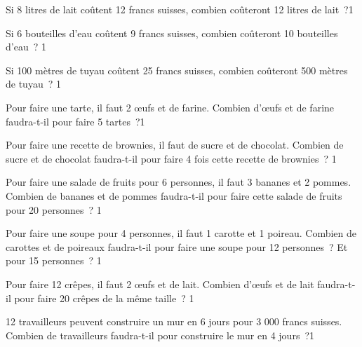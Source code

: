 \documentclass[a4paper,11pt]{report}
\begin{document}
\begin{exo} %
{Si 8 litres de lait coûtent 12 francs suisses, combien coûteront 12 litres de lait~?}{1}
\end{exo}

\begin{exo} %
{Si 6 bouteilles d'eau coûtent 9 francs suisses, combien coûteront 10 bouteilles d'eau~?
}{1}
\end{exo}


\begin{exo} %
{Si 100 mètres de tuyau coûtent 25 francs suisses, combien coûteront 500 mètres de tuyau~?
}{1}
\end{exo}

\begin{exo} %
	{Pour faire une tarte, il faut 2 œufs et  de farine. Combien d'œufs et de farine faudra-t-il pour faire 5 tartes~?}{1}
\end{exo}


\begin{exo} %
	{Pour faire une recette de brownies, il faut  de sucre et  de chocolat. Combien de sucre et de chocolat faudra-t-il pour faire 4 fois cette recette de brownies~?
}{1}
\end{exo}

\begin{exo} %
{Pour faire une salade de fruits pour 6 personnes, il faut 3 bananes et 2 pommes. Combien de bananes et de pommes faudra-t-il pour faire cette salade de fruits pour 20 personnes~?
}{1}
\end{exo}

\begin{exo} %
{Pour faire une soupe pour 4 personnes, il faut 1 carotte et 1 poireau. Combien de carottes et de poireaux faudra-t-il pour faire une soupe pour 12 personnes~? Et pour 15 personnes~?
}{1}
\end{exo}

\begin{exo} %
	{Pour faire 12 crêpes, il faut 2 œufs et  de lait. Combien d'œufs et de lait faudra-t-il pour faire 20 crêpes de la même taille~?
}{1}
\end{exo}

\begin{exo}%
{12 travailleurs peuvent construire un mur en 6 jours pour 3 000 francs suisses. Combien de travailleurs faudra-t-il pour construire le mur en 4 jours~?}{1}
\end{exo}
\end{document}
